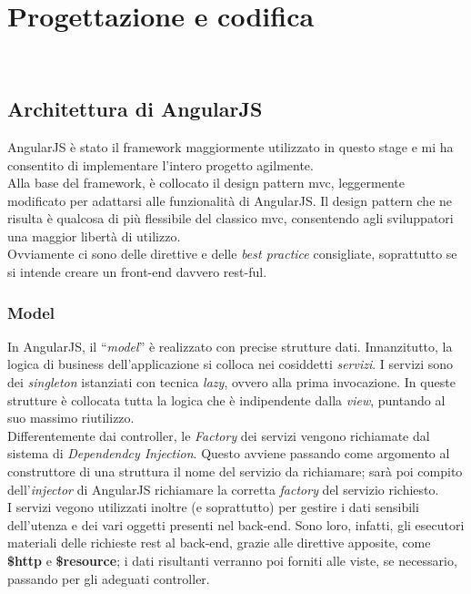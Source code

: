 
\chapter{Progettazione e codifica}
\label{cap:progettazione-codifica}

\\


\section{Architettura di AngularJS}
AngularJS è stato il framework maggiormente utilizzato in questo stage e mi ha consentito di implementare l'intero progetto agilmente.\\
Alla base del framework, è collocato il design pattern \gls{mvc}, leggermente modificato per adattarsi alle funzionalità di AngularJS. Il design pattern che ne risulta è qualcosa di più flessibile del classico \gls{mvc}, consentendo agli sviluppatori una maggior libertà di utilizzo.\\
Ovviamente ci sono delle direttive e delle \emph{best practice} consigliate, soprattutto se si intende creare un \gls{front-end} davvero \gls{rest}-ful.

\subsection{Model}
In AngularJS, il "`\emph{model}"' è realizzato con precise strutture dati. Innanzitutto, la logica di business dell'applicazione si colloca nei cosiddetti \emph{servizi}. I servizi sono dei \emph{singleton} istanziati con tecnica \emph{lazy}, ovvero alla prima invocazione. In queste strutture è collocata tutta la logica che è indipendente dalla \emph{view}, puntando al suo massimo riutilizzo.\\
Differentemente dai controller, le \emph{Factory} dei servizi vengono richiamate dal sistema di \emph{Dependendcy Injection}. Questo avviene passando come argomento al construttore di una struttura il nome del servizio da richiamare; sarà poi compito dell'\emph{injector} di AngularJS richiamare la corretta \emph{factory} del servizio richiesto.\\
I servizi vegono utilizzati inoltre (e soprattutto) per gestire i dati sensibili dell'utenza e dei vari oggetti presenti nel \gls{back-end}. Sono loro, infatti, gli esecutori materiali delle richieste \gls{rest} al \gls{back-end}, grazie alle direttive apposite, come \textbf{\$http} e \textbf{\$resource}; i dati risultanti verranno poi forniti alle viste, se necessario, passando per gli adeguati controller.

